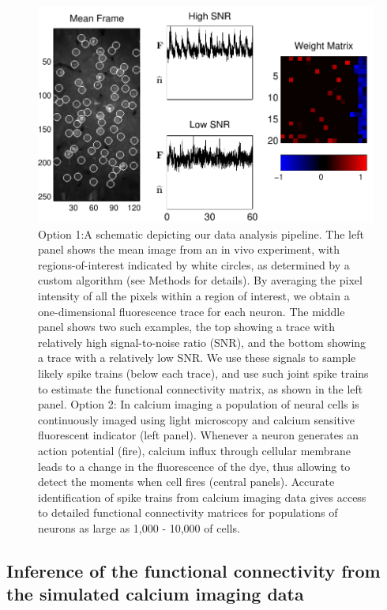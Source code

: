 \begin{figure}[h] 
\centering \includegraphics[width=\hsize]{../figs/data_example} 
\caption{Option 1:A schematic depicting our data analysis pipeline. The left panel shows the mean image from an in vivo experiment, with regions-of-interest indicated by white circles, as determined by a custom algorithm (see Methods for details). By averaging the pixel intensity of all the pixels within a region of interest, we obtain a one-dimensional fluorescence trace for each neuron. The middle panel shows two such examples, the top showing a trace with relatively high signal-to-noise ratio (SNR), and the bottom showing a trace with a relatively low SNR. We use these signals to sample likely spike trains (below each trace), and use such joint spike trains to estimate the functional connectivity matrix, as shown in the left panel. Option 2: In calcium imaging a population of neural cells is continuously imaged using light microscopy and calcium sensitive fluorescent indicator (left panel). Whenever a neuron generates an action potential (fire), calcium influx through cellular membrane leads to a change in the fluorescence of the dye, thus allowing to detect the moments when cell fires (central panels). Accurate identification of spike trains from calcium imaging data gives access to detailed functional connectivity matrices for populations of neurons as large as 1,000 - 10,000 of cells.} 
\label{fig:egfluor} 
\end{figure}


\subsection{Inference of the functional connectivity from the simulated calcium imaging data} \label{sec:results:inference}


